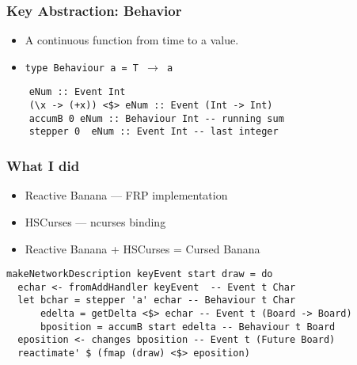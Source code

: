 \documentclass{beamer}
\begin{document}
\begin{frame}[fragile]
  \frametitle{Key Abstraction: Behavior}

  \begin{itemize}
    \item A continuous function from time to a value.
    \item \texttt{type Behaviour a = T $\rightarrow$  a}
  \end{itemize}
  \begin{Verbatim}
    eNum :: Event Int
    (\x -> (+x)) <$> eNum :: Event (Int -> Int)
    accumB 0 eNum :: Behaviour Int -- running sum
    stepper 0  eNum :: Event Int -- last integer
  \end{Verbatim}
\end{frame}


\begin{frame}[fragile]
  \frametitle{What I did}

  \begin{itemize}
    \item Reactive Banana --- FRP implementation
    \item HSCurses --- ncurses binding
    \item Reactive Banana + HSCurses = Cursed Banana
  \end{itemize}

  \small
  \begin{Verbatim}
makeNetworkDescription keyEvent start draw = do
  echar <- fromAddHandler keyEvent  -- Event t Char
  let bchar = stepper 'a' echar -- Behaviour t Char
      edelta = getDelta <$> echar -- Event t (Board -> Board)
      bposition = accumB start edelta -- Behaviour t Board
  eposition <- changes bposition -- Event t (Future Board)
  reactimate' $ (fmap (draw) <$> eposition)

  \end{Verbatim}
\end{frame}
\end{document}
